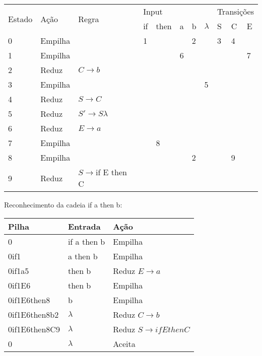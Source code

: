 \documentclass{article}
\begin{document}
\begin{table}[h]
\begin{tabular}{|l|l|l|l|l|l|l|l|l|l|l|}
\hline
\multirow{2}{*}{Estado} & \multirow{2}{*}{Ação} & \multirow{2}{*}{Regra} & \multicolumn{5}{l|}{Input} & \multicolumn{3}{l|}{Transições} \\ \cline{4-11} 
 &  &  & if & then & a & b & $\lambda$ & S & C & E \\ \hline
0 & Empilha &  & 1 &  &  & 2 &  & 3 & 4 &  \\ \hline
1 & Empilha &  &  &  & 6 &  &  &  &  & 7 \\ \hline
2 & Reduz & $ C \rightarrow b $ &  &  &  &  &  &  &  &  \\ \hline
3 & Empilha &  &  &  &  &  & 5 &  &  &  \\ \hline
4 & Reduz & $ S \rightarrow C $ &  &  &  &  &  &  &  &  \\ \hline
5 & Reduz & $ S' \rightarrow S \lambda $ &  &  &  &  &  &  &  &  \\ \hline
6 & Reduz & $ E \rightarrow a $ &  &  &  &  &  &  &  &  \\ \hline
7 & Empilha &  &  & 8 &  &  &  &  &  &  \\ \hline
8 & Empilha &  &  &  &  & 2 &  &  & 9 &  \\ \hline
9 & Reduz & $ S \rightarrow $if E then C  &  &  &  &  &  &  &  &  \\ \hline
\end{tabular}
\end{table}


Reconhecimento da cadeia if a then b:

\begin{table}[h]
\begin{tabular}{|l|l|l|}
\hline
\textbf{Pilha} & \textbf{Entrada} & \textbf{Ação} \\ \hline
0 & if a then b & Empilha \\ \hline
0if1 & a then b & Empilha \\ \hline
0if1a5 & then b & Reduz $E \rightarrow a$ \\ \hline
0if1E6 & then b & Empilha \\ \hline
0if1E6then8 & b & Empilha \\ \hline
0if1E6then8b2 & $\lambda$ & Reduz $C \rightarrow b$ \\ \hline
0if1E6then8C9 & $\lambda$ & Reduz $S \rightarrow if E then C$ \\ \hline
0 & $\lambda$ & Aceita \\ \hline
\end{tabular}
\end{table}
\end{document}

